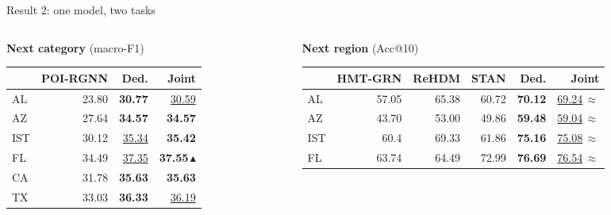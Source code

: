 \documentclass{beamer}
\begin{document}
\begin{frame}{Result 2: one model, two tasks}
    \vspace{0pt}%
    {\small\setlength{\tabcolsep}{2.6pt}\renewcommand{\arraystretch}{1.0}
    \begin{columns}[T,onlytextwidth]
    \begin{column}{0.38\textwidth}
        \centering \textbf{Next category} {\scriptsize (macro-F1)}\\[1mm]
        \begin{tabular}{@{}lrrr@{}}
            \toprule & POI-RGNN & Ded. & Joint \\ \midrule
            AL  & 23.80 & \textbf{30.77} & \underline{30.59} \\
            AZ  & 27.64 & \textbf{34.57} & \textbf{34.57} \\
            IST & 30.12 & \underline{35.34} & \textbf{35.42} \\
            FL  & 34.49 & \underline{37.35} & \textbf{37.55}\,\textcolor{primaryshade}{$\blacktriangle$} \\
            CA  & 31.78 & \textbf{35.63} & \textbf{35.63} \\
            TX  & 33.03 & \textbf{36.33} & \underline{36.19} \\
            \bottomrule
        \end{tabular}
    \end{column}
    \begin{column}{0.60\textwidth}
        \centering \textbf{Next region} {\scriptsize (Acc@10)}\\[1mm]
        \begin{tabular}{@{}lrrrrr@{}}
            \toprule & HMT-GRN & ReHDM & STAN & Ded. & Joint \\ \midrule
            AL  & 57.05 & 65.38 & 60.72 & \textbf{70.12} & \underline{69.24}\,\textcolor{secondary}{$\approx$} \\
            AZ  & 43.70 & 53.00 & 49.86 & \textbf{59.48} & \underline{59.04}\,\textcolor{secondary}{$\approx$} \\
            IST & 60.4  & 69.33 & 61.86 & \textbf{75.16} & \underline{75.08}\,\textcolor{secondary}{$\approx$} \\
            FL  & 63.74 & 64.49 & 72.99 & \textbf{76.69} & \underline{76.54}\,\textcolor{secondary}{$\approx$} \\

\end{tabular}
\end{column}
\end{columns}}
\end{frame}
\end{document}
